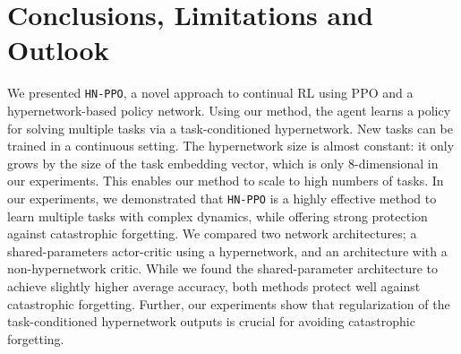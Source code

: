 \documentclass[dvipsnames]{article} %
\newcommand{\commentOLD}[1]{}
\newcommand{\jhOLD}[1] {\commentOLD{{\color{RawSienna} JH: #1}}}           %
\begin{document}
\section{Conclusions, Limitations and Outlook}
\label{chap:conclusion}
We presented \texttt{HN-PPO}, a novel approach to continual RL using PPO and a hypernetwork-based policy network. Using our method, the agent learns a policy for solving multiple tasks via a task-conditioned hypernetwork. New tasks can be trained in a continuous setting. The hypernetwork size is almost constant: it only grows by the size of the task embedding vector, which is only 8-dimensional in our experiments. This enables our method to scale to high numbers of tasks. In our experiments, we demonstrated that \texttt{HN-PPO} is a highly effective method to learn multiple tasks with complex dynamics, while offering strong protection against catastrophic forgetting. We compared two network architectures; a shared-parameters actor-critic using a hypernetwork, and an architecture with a non-hypernetwork critic. While we found the shared-parameter architecture to achieve slightly higher average accuracy, both methods protect well against catastrophic forgetting. Further, our experiments show that regularization of the task-conditioned hypernetwork outputs is crucial for avoiding catastrophic forgetting. 
\end{document}

